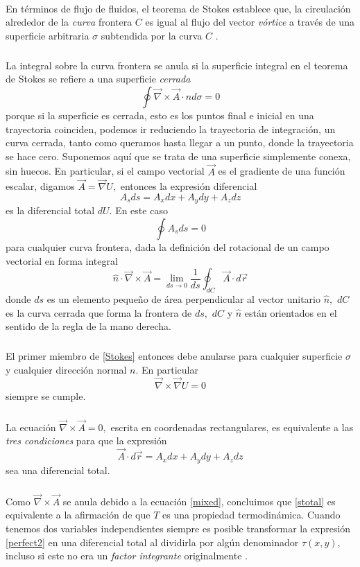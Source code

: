 \documentclass{article}
\theoremstyle{definition} \newtheorem{defi}{Definici\'on}
\theoremstyle{definition} \newtheorem{teo}{Teorema}
\theoremstyle{definition} \newtheorem{cor}{Corolario}
\begin{document}
\paragraph{}
En t\'erminos de flujo de fluidos, el teorema de Stokes establece que, la circulaci\'on alrededor de la \emph{curva} frontera $C$ es igual al flujo del vector \emph{v\'ortice} a trav\'es de una superficie arbitraria $\sigma$ subtendida por la curva $C$ \cite{AS2}.
\subparagraph{}
La integral sobre la curva frontera se anula si la superficie integral en el teorema de Stokes se refiere a una superficie \emph{cerrada}
$$\oint  \vec \nabla \times \vec A \cdot \hat{n} d\sigma = 0$$
porque si la superficie es cerrada, esto es los puntos final e inicial en una trayectoria coinciden, podemos ir reduciendo la trayectoria de integraci\'on, un curva cerrada, tanto como queramos hasta llegar a un punto, donde la trayectoria se hace cero. Suponemos aqu\'i que se trata de una superficie simplemente conexa, sin huecos. En particular, si el campo vectorial $\vec A$ es el gradiente de una funci\'on escalar, digamos $\vec A = \vec \nabla U,$ entonces la expresi\'on diferencial
$$A_s ds = A_x dx + A_y dy + A_z dz$$
es la diferencial total $dU$. En este caso
$$\oint A_s ds = 0$$
para cualquier curva frontera, dada la definici\'on del rotacional de un campo vectorial en forma integral
\begin{equation}
\hat{n} \cdot \vec \nabla \times \vec A=\lim_{ds \rightarrow 0}\frac{1}{ds}\oint_{dC}\vec A\cdot d\vec r
\end{equation}
donde $ds$ es un elemento peque\~no de \'area perpendicular al vector unitario $\hat{n},$ $dC$ es la curva cerrada que forma la frontera de $ds,$ $dC$ y $\hat{n}$ est\'an orientados en el sentido de la regla de la mano derecha.
\subparagraph{}
El primer miembro de \eqref{Stokes} entonces debe anularse para cualquier superficie $\sigma$ y cualquier direcci\'on normal $n$. En particular
$$\vec \nabla \times \vec \nabla U = 0$$
siempre se cumple.
\subparagraph{}
La ecuaci\'on $\vec \nabla \times \vec A = 0,$ escrita en coordenadas rectangulares, es equivalente a las \emph{tres condiciones} para que la expresi\'on 
\begin{equation}
\vec A \cdot d \vec r = A_x dx + A_y dy + A_z dz
\end{equation}
sea una diferencial total.
\subparagraph{}
Como $\vec \nabla \times \vec A$ se anula debido a la ecuaci\'on \eqref{mixed}, concluimos que \eqref{stotal} es equivalente a la afirmaci\'on de que $T$ es una propiedad termodin\'amica.
Cuando tenemos dos variables independientes siempre es posible transformar la expresi\'on \eqref{perfect2} en una diferencial total al dividirla por alg\'un denominador $\tau(x,y)$, incluso si este no era un \emph{factor integrante} originalmente \cite{AS}.
\end{document}
